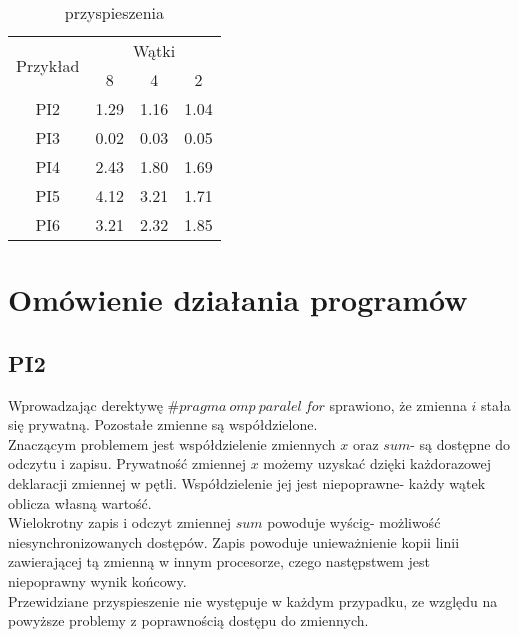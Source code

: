 \documentclass{article}
\begin{document}
\begin{table}[!htb]
\centering
\begin{tabular}{|c|l|l|l|}
\hline
\multirow{2}{*}{Przykład} & \multicolumn{3}{c|}{Wątki}                                               \\ \cline{2-4} 
                          & \multicolumn{1}{c|}{8} & \multicolumn{1}{c|}{4} & \multicolumn{1}{c|}{2} \\ \hline
PI2                       & 1.29                   & 1.16                   & 1.04                   \\ \hline
PI3                       & 0.02                   & 0.03                   & 0.05                   \\ \hline
PI4                       & 2.43                   & 1.80                   & 1.69                   \\ \hline
PI5                       & 4.12                   & 3.21                   & 1.71                   \\ \hline
PI6                       & 3.21                   & 2.32                   & 1.85                   \\ \hline
\end{tabular}
\caption{przyspieszenia}
\end{table}

\newpage

\section{Omówienie działania programów}
\subsection{PI2}
Wprowadzając derektywę $\#pragma\:omp\:paralel\:for$ sprawiono, że zmienna $i$ stała się prywatną. Pozostałe zmienne są współdzielone.\\
Znaczącym problemem jest współdzielenie zmiennych $x$ oraz $sum$- są dostępne do odczytu i zapisu. Prywatność zmiennej $x$ możemy uzyskać dzięki każdorazowej deklaracji zmiennej w pętli. Współdzielenie jej jest niepoprawne- każdy wątek oblicza własną wartość. \\
Wielokrotny zapis i odczyt zmiennej $sum$ powoduje wyścig- możliwość niesynchronizowanych dostępów. Zapis powoduje unieważnienie kopii linii zawierającej tą zmienną w innym procesorze, czego następstwem jest niepoprawny wynik końcowy.\\
Przewidziane przyspieszenie nie występuje w każdym przypadku, ze względu na powyższe problemy z poprawnością dostępu do zmiennych.
\end{document}
